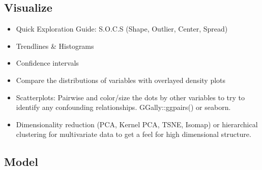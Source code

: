 \documentclass[]{book}
\theoremstyle{definition}
\theoremstyle{definition}
\theoremstyle{definition}
\theoremstyle{remark}
\begin{document}
\subsection{Visualize}\label{visualize}

\begin{itemize}
\item
  Quick Exploration Guide: S.O.C.S (Shape, Outlier, Center, Spread)
\item
  Trendlines \& Histograms
\item
  Confidence intervals
\item
  Compare the distributions of variables with overlayed density plots
\item
  Scatterplots: Pairwise and color/size the dots by other variables to
  try to identify any confounding relationships. GGally::ggpairs() or
  seaborn.
\item
  Dimensionality reduction (PCA, Kernel PCA, TSNE, Isomap) or
  hierarchical clustering for multivariate data to get a feel for high
  dimensional structure.
\end{itemize}

\subsection{Model}\label{model}
\end{document}
